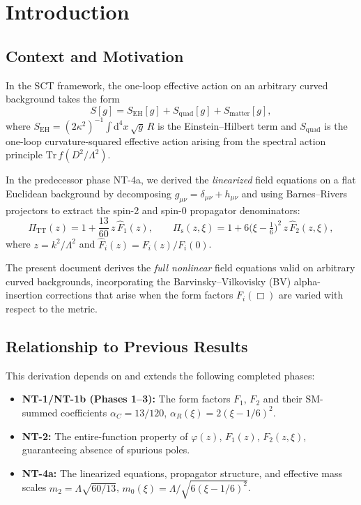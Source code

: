 \documentclass[11pt,a4paper]{article}
\renewcommand{\dd}{\mathrm{d}}
\theoremstyle{plain}
\theoremstyle{definition}
\begin{document}
\section{Introduction}\label{sec:intro}

\subsection{Context and Motivation}

In the SCT framework, the one-loop effective action on an arbitrary
curved background takes the form
\begin{equation}\label{eq:S-total}
  S[g] = S_{\mathrm{EH}}[g] + S_{\mathrm{quad}}[g] + S_{\mathrm{matter}}[g],
\end{equation}
where $S_{\mathrm{EH}} = (2\kappa^2)^{-1}\int\dd^4 x\,\sqrt{g}\,R$ is
the Einstein--Hilbert term and $S_{\mathrm{quad}}$ is the one-loop
curvature-squared effective action arising from the spectral action
principle $\mathrm{Tr}\,f(D^2/\Lambda^2)$.

In the predecessor phase NT-4a, we derived the \emph{linearized} field
equations on a flat Euclidean background by decomposing
$g_{\mu\nu} = \delta_{\mu\nu} + h_{\mu\nu}$ and using Barnes--Rivers
projectors to extract the spin-2 and spin-0 propagator denominators:
\begin{equation}\label{eq:pi-tt-recap}
  \Pi_{\mathrm{TT}}(z) = 1 + \frac{13}{60}\,z\,\hat{F}_1(z),
  \qquad
  \Pi_{\mathrm{s}}(z,\xi) = 1 + 6\bigl(\xi - \tfrac{1}{6}\bigr)^2\,z\,
  \hat{F}_2(z,\xi),
\end{equation}
where $z = k^2/\Lambda^2$ and $\hat{F}_i(z) = F_i(z)/F_i(0)$.

The present document derives the \emph{full nonlinear} field equations
valid on arbitrary curved backgrounds, incorporating the
Barvinsky--Vilkovisky (BV) alpha-insertion corrections that arise when
the form factors $F_i(\Box)$ are varied with respect to the metric.

\subsection{Relationship to Previous Results}

This derivation depends on and extends the following completed phases:
\begin{itemize}[nosep]
  \item \textbf{NT-1/NT-1b (Phases 1--3):} The form factors $F_1$, $F_2$
    and their SM-summed coefficients $\alpha_C = 13/120$,
    $\alpha_R(\xi) = 2(\xi-1/6)^2$.
  \item \textbf{NT-2:} The entire-function property of $\varphi(z)$,
    $F_1(z)$, $F_2(z,\xi)$, guaranteeing absence of spurious poles.
  \item \textbf{NT-4a:} The linearized equations, propagator structure,
    and effective mass scales $m_2 = \Lambda\sqrt{60/13}$,
    $m_0(\xi) = \Lambda/\sqrt{6(\xi-1/6)^2}$.
\end{itemize}
\end{document}
